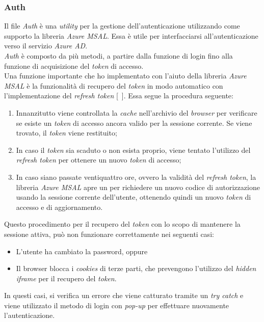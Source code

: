 \subsubsection{Auth}\label{subsubsec:auth-utils}
Il file \textit{Auth} è una \textit{utility} per la gestione dell'autenticazione utilizzando come supporto la libreria \textit{Azure MSAL}. Essa è utile
per interfacciarsi all'autenticazione verso il servizio \textit{Azure AD}.\\
\textit{Auth} è composto da più metodi, a partire dalla funzione di login fino alla funzione di acquisizione del \textit{token} di accesso.\\
Una funzione importante che ho implementato con l'aiuto della libreria \textit{Azure MSAL} è la funzionalità di recupero del \textit{token} in modo automatico con 
l'implementazione del \textit{refresh token} [~\cite{site:token}]. Essa segue la procedura seguente:
\begin{enumerate}
  \item Innanzitutto viene controllata la \textit{cache} nell'archivio del \textit{browser} per verificare se esiste un \textit{token} di accesso ancora valido per la sessione corrente. Se viene trovato, il \textit{token} viene restituito;
  \item In caso il \textit{token} sia scaduto o non esista proprio, viene tentato l'utilizzo del \textit{refresh token} per ottenere un nuovo \textit{token} di accesso;
  \item In caso siano passate ventiquattro ore, ovvero la validità del \textit{refresh token}, la libreria \textit{Azure MSAL} apre un  per richiedere
  un nuovo codice di autorizzazione usando la sessione corrente dell'utente, ottenendo quindi un nuovo \textit{token} di accesso e di aggiornamento. 
\end{enumerate}
Questo procedimento per il recupero del \textit{token} con lo scopo di mantenere la sessione attiva, può non funzionare correttamente nei seguenti casi:
\begin{itemize}
  \item L'utente ha cambiato la password, oppure
  \item Il browser blocca i \textit{cookies} di terze parti, che prevengono l'utilizzo del \textit{hidden iframe} per il recupero del \textit{token}.
\end{itemize}
In questi casi, si verifica un errore che viene catturato tramite un \textit{try catch} e viene utilizzato il metodo di login con \textit{pop-up} per effettuare nuovamente l'autenticazione.
